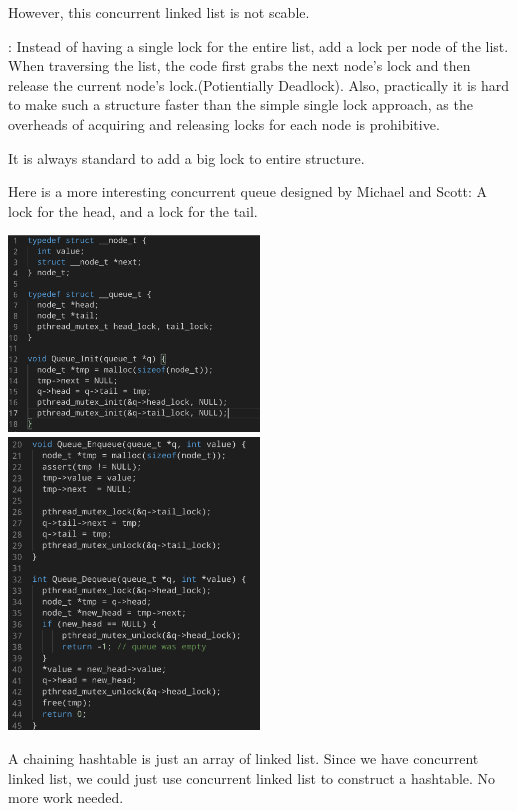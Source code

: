     However, this concurrent linked list is not scable.

     : Instead of having a single lock for the entire list, add a lock per node
    of the list. When traversing the list, the  code first grabs the next node's lock and then release the 
    current node's lock.(Potientially Deadlock).  Also, practically it is hard to make such a structure faster
    than the simple single lock approach, as the overheads of acquiring and releasing locks for each node is 
    prohibitive.


    It is always standard to add a big lock to entire structure.

    Here is a more interesting concurrent queue designed by Michael and Scott: A lock for the head, and a lock for
    the tail.

    \includegraphics[width=0.5\textwidth]{chapters/Cucurrency/Cucurrency/concurrent_queue_init.png}
    \includegraphics[width=0.5\textwidth]{chapters/Cucurrency/Cucurrency/concurrent_queue_operations.png}




    A chaining hashtable is just an array of linked list. Since we have concurrent linked list,
    we could just use concurrent linked list to construct a hashtable. No more work needed.

